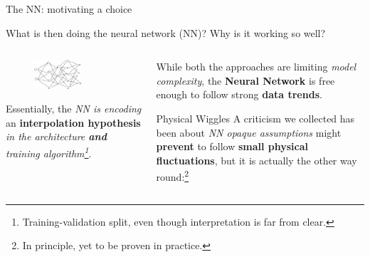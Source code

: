 \documentclass[9pt]{beamer}
\begin{document}
\begin{frame}{The NN: motivating a choice}
    \vspace*{10pt}

    \begin{center}
        What is then doing the neural network (NN)? Why is it working so well?
    \end{center}
    \vspace*{20pt}

    \begin{columns}
        \begin{column}{0.5\textwidth}
            \begin{figure}
                \centering
                \includegraphics[width=0.6\textwidth]{nn}
            \end{figure}

            \vspace*{10pt}
            Essentially, the \textit{NN is encoding} an
            \alert{\textbf{interpolation hypothesis}} \textit{in the
            architecture \textbf{and} training algorithm\footnote{
                Training-validation split, even though interpretation is far
                from clear.
            }}.
        \end{column}
        \begin{column}{0.5\textwidth}
            While both the approaches are limiting \textit{model complexity},
            the \textbf{Neural Network} is free enough to follow strong
            \textbf{data trends}.

            \vspace*{10pt}
            \begin{exampleblock}{Physical Wiggles}
                A criticism we collected has been about \textit{NN opaque
                assumptions} might \textbf{prevent} to follow \textbf{small
                physical fluctuations}, but it is actually the other way
                round:\footnote{In principle, yet to be proven in practice.}


\end{exampleblock}
\end{column}
\end{columns}
\end{frame}
\end{document}
